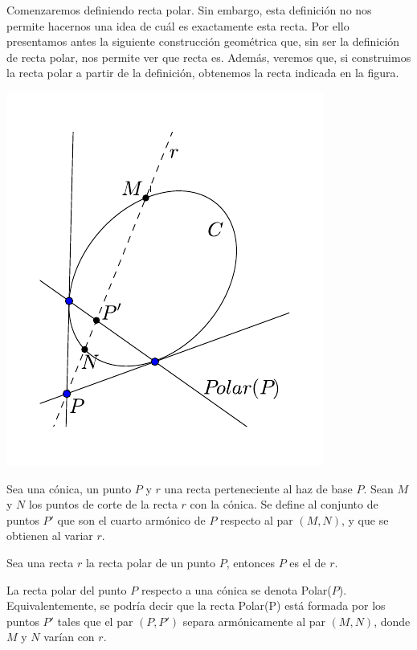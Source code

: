 Comenzaremos definiendo recta polar. Sin embargo, esta definición no nos permite hacernos una idea de cuál es exactamente esta recta. Por ello presentamos antes la siguiente construcción geométrica que, sin ser la definición de recta polar, nos permite ver que recta es. Además, veremos que, si construimos la recta polar a partir de la definición, obtenemos la recta indicada en la figura.
\begin{center}
	\includegraphics[scale=.8]{Graficos/Conicas/Polar}
\end{center}
\begin{defi}
	Sea una cónica, un punto $P$ y $r$ una recta perteneciente al haz de base $P$. Sean $M$ y $N$ los puntos de corte de la recta $r$ con la cónica. Se define  al conjunto de puntos $P'$ que son el cuarto armónico de $P$ respecto al par $(M,N)$, y que se obtienen al variar $r$.
\end{defi}
\begin{defi}
	Sea una recta $r$ la recta polar de un punto $P$, entonces $P$ es el  de $r$.
\end{defi}

La recta polar del punto $P$ respecto a una cónica se denota Polar($P$). Equivalentemente, se podría decir que la recta Polar(P) está formada por los puntos $P'$ tales que el par $(P,P')$ separa armónicamente al par $(M,N)$, donde $M$ y $N$ varían con $r$.\\

